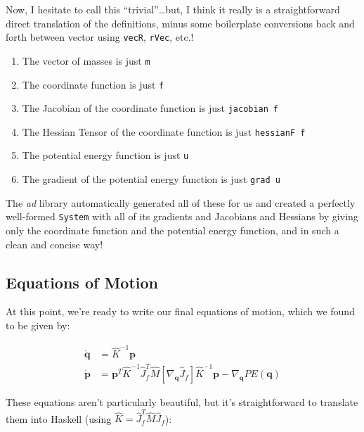 \documentclass[]{article}
\begin{document}
Now, I hesitate to call this ``trivial''\ldots but, I think it really is a
straightforward direct translation of the definitions, minus some boilerplate
conversions back and forth between vector using \texttt{vecR}, \texttt{rVec},
etc.!

\begin{enumerate}
\def\labelenumi{\arabic{enumi}.}
\tightlist
\item
  The vector of masses is just \texttt{m}
\item
  The coordinate function is just \texttt{f}
\item
  The Jacobian of the coordinate function is just \texttt{jacobian\ f}
\item
  The Hessian Tensor of the coordinate function is just \texttt{hessianF\ f}
\item
  The potential energy function is just \texttt{u}
\item
  The gradient of the potential energy function is just \texttt{grad\ u}
\end{enumerate}

The \emph{ad} library automatically generated all of these for us and created a
perfectly well-formed \texttt{System} with all of its gradients and Jacobians
and Hessians by giving only the coordinate function and the potential energy
function, and in such a clean and concise way!

\hypertarget{equations-of-motion}{%
\subsection{Equations of Motion}\label{equations-of-motion}}

At this point, we're ready to write our final equations of motion, which we
found to be given by:

\[
\begin{aligned}
\dot{\mathbf{q}} & = \hat{K}^{-1} \mathbf{p} \\
\dot{\mathbf{p}} & = \mathbf{p}^T \hat{K}^{-1} \hat{J}_f^T \hat{M}
        \left[ \nabla_{\mathbf{q}} \hat{J}_f \right] \hat{K}^{-1} \mathbf{p}
    - \nabla_{\mathbf{q}} PE(\mathbf{q})
\end{aligned}
\]

These equations aren't particularly beautiful, but it's straightforward to
translate them into Haskell (using \(\hat{K} = \hat{J}_f^T \hat{M} \hat{J}_f\)):
\end{document}
